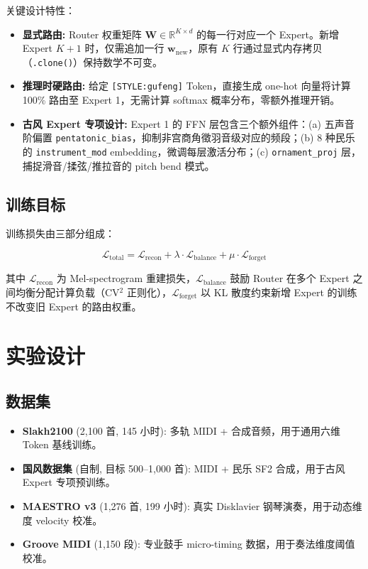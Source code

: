 \documentclass[12pt,a4paper]{article}
\begin{document}
关键设计特性：

\begin{itemize}
\item \textbf{显式路由:} Router 权重矩阵 $\mathbf{W} \in \mathbb{R}^{K \times d}$ 的每一行对应一个 Expert。新增 Expert $K+1$ 时，仅需追加一行 $\mathbf{w}_{\text{new}}$，原有 $K$ 行通过显式内存拷贝（\texttt{.clone()}）保持数学不可变。

\item \textbf{推理时硬路由:} 给定 \texttt{[STYLE:gufeng]} Token，直接生成 one-hot 向量将计算 100\% 路由至 Expert 1，无需计算 softmax 概率分布，零额外推理开销。

\item \textbf{古风 Expert 专项设计:} Expert 1 的 FFN 层包含三个额外组件：(a) 五声音阶偏置 \texttt{pentatonic\_bias}，抑制非宫商角徵羽音级对应的频段；(b) 8 种民乐的 \texttt{instrument\_mod} embedding，微调每层激活分布；(c) \texttt{ornament\_proj} 层，捕捉滑音/揉弦/推拉音的 pitch bend 模式。
\end{itemize}

\subsection{训练目标}

训练损失由三部分组成：

\begin{equation}
\mathcal{L}_{\text{total}} = \mathcal{L}_{\text{recon}} + \lambda \cdot \mathcal{L}_{\text{balance}} + \mu \cdot \mathcal{L}_{\text{forget}}
\end{equation}

其中 $\mathcal{L}_{\text{recon}}$ 为 Mel-spectrogram 重建损失，$\mathcal{L}_{\text{balance}}$ 鼓励 Router 在多个 Expert 之间均衡分配计算负载（CV$^2$ 正则化），$\mathcal{L}_{\text{forget}}$ 以 KL 散度约束新增 Expert 的训练不改变旧 Expert 的路由权重。

\section{实验设计}

\subsection{数据集}

\begin{itemize}
\item \textbf{Slakh2100} (2,100 首, 145 小时): 多轨 MIDI + 合成音频，用于通用六维 Token 基线训练。
\item \textbf{国风数据集} (自制, 目标 500--1,000 首): MIDI + 民乐 SF2 合成，用于古风 Expert 专项预训练。
\item \textbf{MAESTRO v3} (1,276 首, 199 小时): 真实 Disklavier 钢琴演奏，用于动态维度 velocity 校准。
\item \textbf{Groove MIDI} (1,150 段): 专业鼓手 micro-timing 数据，用于奏法维度阈值校准。
\end{itemize}
\end{document}
